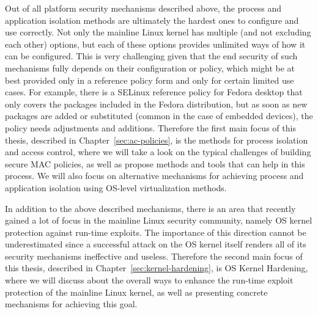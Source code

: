 Out of all platform security mechanisms described above, the process and application isolation methods are ultimately the hardest ones to configure and use correctly. Not only the mainline Linux kernel has multiple (and not excluding each other) options, but each of these options provides unlimited ways of how it can be configured. This is very challenging given that the end security of such mechanisms fully depends on their configuration or policy, which might be at best provided only in a reference policy form and only for certain limited use cases. For example, there is a SELinux reference policy for Fedora desktop that only covers the packages included in the Fedora distribution, but as soon as new packages are added or substituted (common in the case of embedded devices), the policy needs adjustments and additions. Therefore the first main focus of this thesis, described in Chapter~\ref{sec:ac-policies}, is the methods for process isolation and access control, where we will take a look on the typical challenges of building secure MAC policies, as well as propose methods and tools that can help in this process. We will also focus on alternative mechanisms for achieving process and application isolation using OS-level virtualization methods. 

In addition to the above described mechanisms, there is an area that recently gained a lot of focus in the mainline Linux security community, namely OS kernel protection against run-time exploits. The importance of this direction cannot be underestimated since a successful attack on the OS kernel itself renders all of its security mechanisms ineffective and useless. Therefore the second main focus of this thesis, described in Chapter~\ref{sec:kernel-hardening}, is OS Kernel Hardening, where we will discuss about the overall ways to enhance the run-time exploit protection of the mainline Linux kernel, as well as presenting concrete mechanisms for achieving this goal. 
 